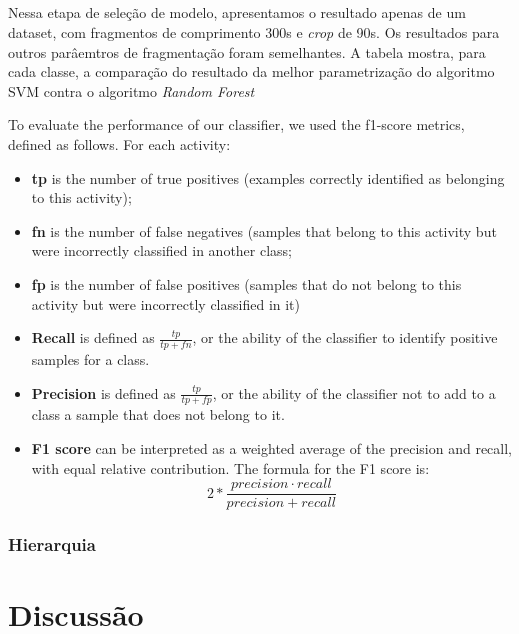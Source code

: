             \paragraph{} Nessa etapa de seleção de modelo, apresentamos o resultado apenas de um dataset, com fragmentos de comprimento 300s e \textit{crop} de 90s. Os resultados para outros parâemtros de fragmentação foram semelhantes. A tabela mostra, para cada classe, a comparação do resultado da melhor parametrização do algoritmo SVM contra o algoritmo \textit{Random Forest}
            
            
  To evaluate the performance of our classifier, we used the f1-score metrics, defined as follows.
  For each activity:
\begin{itemize}
	\item \textbf{tp} is the number of true positives (examples correctly identified as belonging to this activity);
	\item \textbf{fn} is the number of false negatives (samples that belong to this activity but were incorrectly classified in another class;
	\item \textbf{fp} is the number of false positives (samples that do not belong to this activity but were incorrectly classified in it)
	\item \textbf{Recall} is defined as $\frac{tp}{tp + fn}$, or the ability of the classifier to identify positive samples for a class.
	\item \textbf{Precision} is defined as $\frac{tp}{tp + fp}$,  or the ability of the classifier not to add to a class a sample that does not belong to it.
	\item \textbf{F1 score} can be interpreted as a weighted average of the precision and recall, with equal relative contribution. The formula for the F1 score is:  
      \begin{equation}
      2 * \frac{precision \cdot recall}{precision + recall}
      \end{equation}
\end{itemize}

            
            
        \subsection{Hierarquia}
        
        
\chapter{Discussão}
\label{Dicussion}